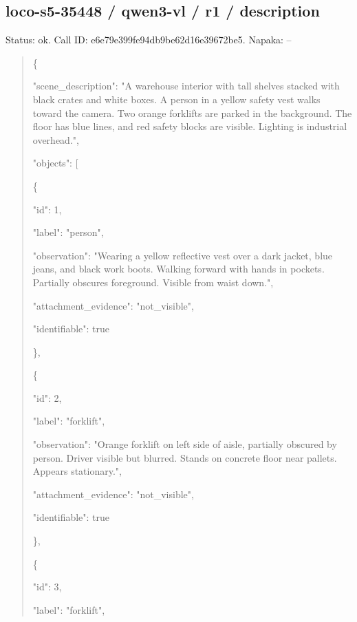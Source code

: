 \documentclass[10pt,a4paper]{article}
\begin{document}
\subsection*{loco-s5-35448 / qwen3-vl / r1 / description}
Status: ok. Call ID: e6e79e399fe94db9be62d16e39672be5. Napaka: --
\begin{quote}\footnotesize
\{\par
  "scene\_description":\allowbreak{} "A warehouse interior with tall shelves stacked with black crates and white boxes. A person in a yellow safety vest walks toward the camera. Two orange forklifts are parked in the background. The floor has blue lines,\allowbreak{} and red safety blocks are visible. Lighting is industrial overhead.",\allowbreak{}\par
  "objects":\allowbreak{} [\par
    \{\par
      "id":\allowbreak{} 1,\allowbreak{}\par
      "label":\allowbreak{} "person",\allowbreak{}\par
      "observation":\allowbreak{} "Wearing a yellow reflective vest over a dark jacket,\allowbreak{} blue jeans,\allowbreak{} and black work boots. Walking forward with hands in pockets. Partially obscures foreground. Visible from waist down.",\allowbreak{}\par
      "attachment\_evidence":\allowbreak{} "not\_visible",\allowbreak{}\par
      "identifiable":\allowbreak{} true\par
    \},\allowbreak{}\par
    \{\par
      "id":\allowbreak{} 2,\allowbreak{}\par
      "label":\allowbreak{} "forklift",\allowbreak{}\par
      "observation":\allowbreak{} "Orange forklift on left side of aisle,\allowbreak{} partially obscured by person. Driver visible but blurred. Stands on concrete floor near pallets. Appears stationary.",\allowbreak{}\par
      "attachment\_evidence":\allowbreak{} "not\_visible",\allowbreak{}\par
      "identifiable":\allowbreak{} true\par
    \},\allowbreak{}\par
    \{\par
      "id":\allowbreak{} 3,\allowbreak{}\par
      "label":\allowbreak{} "forklift",\allowbreak{}\par

\end{quote}
\end{document}
